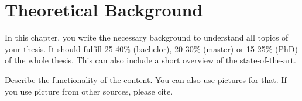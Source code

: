 \chapter{Theoretical Background}
In this chapter, you write the necessary background to understand all topics of your thesis. It should fulfill 25-40\% (bachelor), 20-30\% (master) or 15-25\% (PhD) of the whole thesis. This can also include a short overview of the state-of-the-art.

Describe the functionality of the content. You can also use pictures for that. If you use picture from other sources, please cite.
\newpage